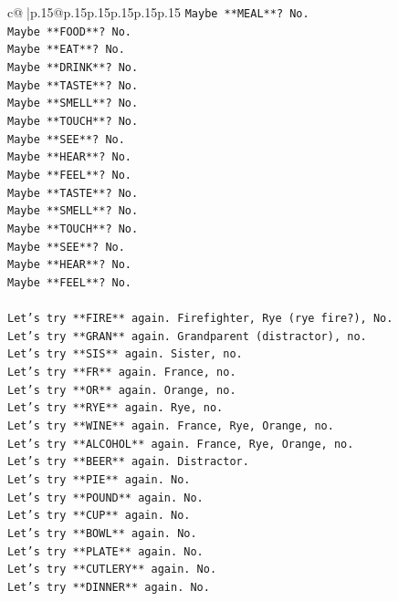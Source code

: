 \documentclass{article}
\begin{document}
{\begin{supertabular}{c@{$\;$}|p{.15\linewidth}@{}p{.15\linewidth}p{.15\linewidth}p{.15\linewidth}p{.15\linewidth}p{.15\linewidth}}
{{{\texttt{Maybe **MEAL**? No.} \\
\texttt{Maybe **FOOD**? No.} \\
\texttt{Maybe **EAT**? No.} \\
\texttt{Maybe **DRINK**? No.} \\
\texttt{Maybe **TASTE**? No.} \\
\texttt{Maybe **SMELL**? No.} \\
\texttt{Maybe **TOUCH**? No.} \\
\texttt{Maybe **SEE**? No.} \\
\texttt{Maybe **HEAR**? No.} \\
\texttt{Maybe **FEEL**? No.} \\
\texttt{Maybe **TASTE**? No.} \\
\texttt{Maybe **SMELL**? No.} \\
\texttt{Maybe **TOUCH**? No.} \\
\texttt{Maybe **SEE**? No.} \\
\texttt{Maybe **HEAR**? No.} \\
\texttt{Maybe **FEEL**? No.} \\
\\ 
\texttt{Let's try **FIRE** again. Firefighter, Rye (rye fire?), No.} \\
\texttt{Let's try **GRAN** again. Grandparent (distractor), no.} \\
\texttt{Let's try **SIS** again. Sister, no.} \\
\texttt{Let's try **FR** again. France, no.} \\
\texttt{Let's try **OR** again. Orange, no.} \\
\texttt{Let's try **RYE** again. Rye, no.} \\
\texttt{Let's try **WINE** again. France, Rye, Orange, no.} \\
\texttt{Let's try **ALCOHOL** again. France, Rye, Orange, no.} \\
\texttt{Let's try **BEER** again. Distractor.} \\
\texttt{Let's try **PIE** again. No.} \\
\texttt{Let's try **POUND** again. No.} \\
\texttt{Let's try **CUP** again. No.} \\
\texttt{Let's try **BOWL** again. No.} \\
\texttt{Let's try **PLATE** again. No.} \\
\texttt{Let's try **CUTLERY** again. No.} \\
\texttt{Let's try **DINNER** again. No.} \\
}}}
\end{supertabular}}
\end{document}
